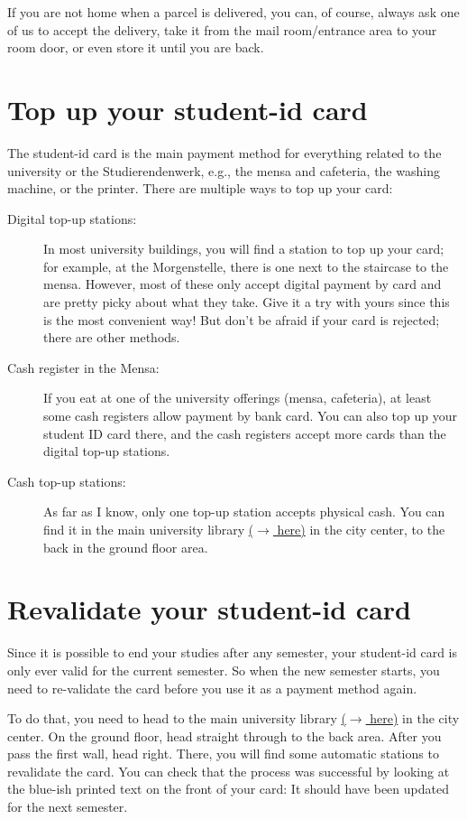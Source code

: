 If you are not home when a parcel is delivered, you can, of course, always ask one of us to accept the delivery, take it from the mail room/entrance area to your room door, or even store it until you are back.

\section{Top up your student-id card}
The student-id card is the main payment method for everything related to the university or the Studierendenwerk, e.g., the mensa and cafeteria, the washing machine, or the printer. There are multiple ways to top up your card:
\begin{description}
    \item[Digital top-up stations:] In most university buildings, you will find a station to top up your card; for example, at the Morgenstelle, there is one next to the staircase to the mensa. However, most of these only accept digital payment by card and are pretty picky about what they take. Give it a try with yours since this is the most convenient way! But don't be afraid if your card is rejected; there are other methods.
    \item[Cash register in the Mensa:] If you eat at one of the university offerings (mensa, cafeteria), at least some cash registers allow payment by bank card. You can also top up your student ID card there, and the cash registers accept more cards than the digital top-up stations.
    \item[Cash top-up stations:] As far as I know, only one top-up station accepts physical cash. You can find it in the main university library \href{https://maps.app.goo.gl/ifwoMYV6JYGK6dXs7}{($\xrightarrow{}$ here)} in the city center, to the back in the ground floor area.
\end{description}

\section{Revalidate your student-id card}
Since it is possible to end your studies after any semester, your student-id card is only ever valid for the current semester. So when the new semester starts, you need to re-validate the card before you use it as a payment method again.

To do that, you need to head to the main university library \href{https://maps.app.goo.gl/ifwoMYV6JYGK6dXs7}{($\xrightarrow{}$ here)} in the city center. On the ground floor, head straight through to the back area. After you pass the first wall, head right. There, you will find some automatic stations to revalidate the card. You can check that the process was successful by looking at the blue-ish printed text on the front of your card: It should have been updated for the next semester.

